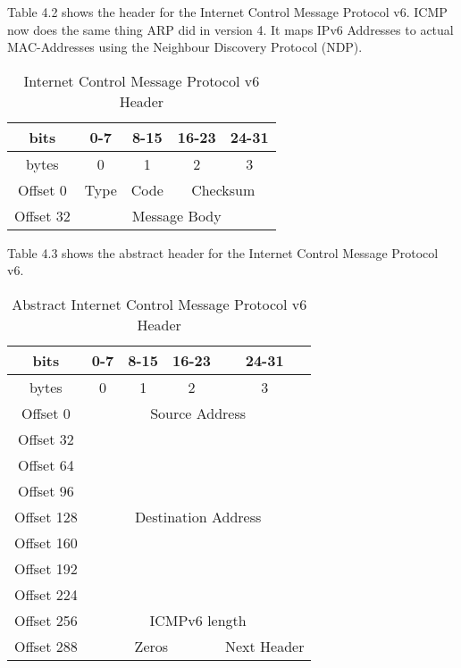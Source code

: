 Table 4.2 shows the header for the Internet Control Message Protocol v6. ICMP now does the same thing ARP did in version 4. It maps IPv6 Addresses to actual MAC-Addresses using the Neighbour Discovery Protocol (NDP).

\begin{table}[H]
	\centering
	\label{icmpv6-header}
	\begin{tabular}{|c|c|c|c|c|}
		\hline
		bits      & 0-7  & 8-15 & 16-23         & 24-31         \\ \hline
		bytes     & 0    & 1    & 2             & 3             \\ \hline
		Offset 0  & Type & Code & \multicolumn{2}{c|}{Checksum} \\ \hline
		Offset 32 & \multicolumn{4}{c|}{Message Body}           \\ \hline
	\end{tabular}
	\caption{Internet Control Message Protocol v6 Header}
\end{table}

Table 4.3 shows the abstract header for the Internet Control Message Protocol v6.
\begin{table}[H]
	\centering
	\label{icmpv6-abstract-header}
	\begin{tabular}{|c|c|c|c|c|}
		\hline
		bits       & 0-7        & 8-15       & 16-23       & 24-31             \\ \hline
		bytes      & 0          & 1          & 2           & 3                 \\ \hline
		Offset 0   & \multicolumn{4}{c|}{Source Address}      \\ \cline{1-1}
		Offset 32  & \multicolumn{4}{c|}{}                                     \\ \cline{1-1}
		Offset 64  & \multicolumn{4}{c|}{}                                     \\ \cline{1-1}
		Offset 96  & \multicolumn{4}{c|}{}                                     \\ \hline
		Offset 128 & \multicolumn{4}{c|}{Destination Address} \\ \cline{1-1}
		Offset 160 & \multicolumn{4}{c|}{}                                     \\ \cline{1-1}
		Offset 192 & \multicolumn{4}{c|}{}                                     \\ \cline{1-1}
		Offset 224 & \multicolumn{4}{c|}{}                                     \\ \hline
		Offset 256 & \multicolumn{4}{c|}{ICMPv6 length}                        \\ \hline
		Offset 288 & \multicolumn{3}{c|}{Zeros}            & Next Header       \\ \hline
	\end{tabular}
	\caption{Abstract Internet Control Message Protocol v6 Header}
\end{table}
